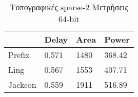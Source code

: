 \begin{multicols}{2}
\begin{table}[H]
\caption{Τοπογραφικές sparse-2 Μετρήσεις 32-bit}
\label{topo_sparse2_result_table_32}
\end{table}
\begin{table}[H]
\centering
     \begin{tabular}{||p{1.2cm} | p{0.7cm} p{1cm} p{1cm} ||} 
        \hline
         & Delay & Area & Power \\ [0.5ex] 
        \hline\hline
        Prefix & 0.571 & 1480 & 368.42 \\
        \hline
        Ling & 0.567 & 1553 & 407.71 \\
        \hline
        Jackson & 0.559 & 1911 & 516.89 \\
        \hline
    \end{tabular}
\caption{Τοπογραφικές sparse-2 Μετρήσεις 64-bit}
\label{topo sparse2_result_table_64}
\end{table}
\end{multicols}








